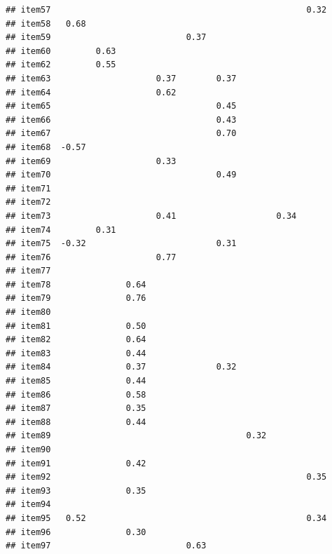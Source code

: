 \documentclass[
  english,
  man]{apa6}
\begin{document}
\begin{verbatim}
## item57                                                   0.32
## item58   0.68                                                
## item59                           0.37                        
## item60         0.63                                          
## item62         0.55                                          
## item63                     0.37        0.37                  
## item64                     0.62                              
## item65                                 0.45                  
## item66                                 0.43                  
## item67                                 0.70                  
## item68  -0.57                                                
## item69                     0.33                              
## item70                                 0.49                  
## item71                                                       
## item72                                                       
## item73                     0.41                    0.34      
## item74         0.31                                          
## item75  -0.32                          0.31                  
## item76                     0.77                              
## item77                                                       
## item78               0.64                                    
## item79               0.76                                    
## item80                                                       
## item81               0.50                                    
## item82               0.64                                    
## item83               0.44                                    
## item84               0.37              0.32                  
## item85               0.44                                    
## item86               0.58                                    
## item87               0.35                                    
## item88               0.44                                    
## item89                                       0.32            
## item90                                                       
## item91               0.42                                    
## item92                                                   0.35
## item93               0.35                                    
## item94                                                       
## item95   0.52                                            0.34
## item96               0.30                                    
## item97                           0.63                        

\end{verbatim}
\end{document}
